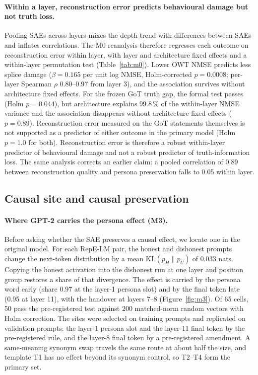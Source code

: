 \paragraph{Within a layer, reconstruction error predicts behavioural damage but not truth loss.} Pooling SAEs across
layers mixes the depth trend with differences between SAEs and inflates correlations. The M0 reanalysis therefore
regresses each outcome on reconstruction error within layer, with layer and architecture fixed effects and a
within-layer permutation test (Table~\ref{tab:m0}). Lower OWT NMSE predicts less splice damage
($\beta=0.165$ per unit log NMSE, Holm-corrected $p=0.0008$; per-layer Spearman $\rho$ 0.80--0.97 from layer 3), and the
association survives without architecture fixed effects. For the frozen GoT truth gap, the formal test passes (Holm
$p=0.044$), but architecture explains 99.8\,\% of the within-layer NMSE variance and the association disappears
without architecture fixed effects ($p=0.89$). Reconstruction error measured on the GoT statements themselves is
not supported as a predictor of either outcome in the primary model (Holm $p=1.0$ for both). Reconstruction error is therefore a robust within-layer predictor of behavioural
damage and not a robust predictor of truth-information loss. The same analysis corrects an earlier claim: a pooled
correlation of 0.89 between reconstruction quality and persona preservation falls to 0.05 within layer.



\subsection{Causal site and causal preservation}\label{sec:causal}

\paragraph{Where GPT-2 carries the persona effect (M3).} Before asking whether the SAE preserves a causal effect, we
locate one in the original model. For each RepE-LM pair, the honest and dishonest prompts change the next-token
distribution by a mean $\mathrm{KL}(p_H\|p_U)$ of 0.033 nats. Copying the honest activation into the dishonest run at
one layer and position group restores a share of that divergence. The effect is carried by the persona word early
(share 0.97 at the layer-1 persona slot) and by the final token late (0.95 at layer 11), with the handover at layers
7--8 (Figure~\ref{fig:m3}). Of 65 cells, 50 pass the pre-registered test against 200 matched-norm random vectors with
Holm correction. The sites were selected on training prompts and replicated on validation prompts: the layer-1 persona
slot and the layer-11 final token by the pre-registered rule, and the layer-8 final token by a pre-registered
amendment. A same-meaning synonym swap travels the same route at about half the size, and template T1 has no effect
beyond its synonym control, so T2--T4 form the primary set.


